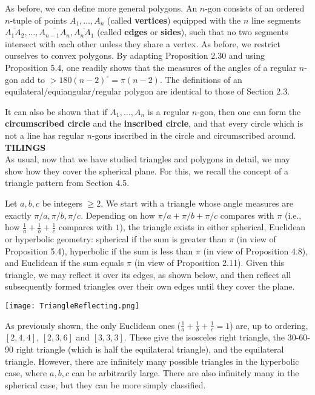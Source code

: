 \documentclass[leqno]{book}
\begin{document}
\noindent As before, we can define more general polygons.  An $n$-gon consists of an ordered $n$-tuple of points $A_1,\dots,A_n$ (called \textbf{vertices}) equipped with the $n$ line segments $\overline{A_1A_2},\dots,\overline{A_{n-1}A_n},\overline{A_nA_1}$ (called \textbf{edges} or \textbf{sides}), such that no two segments intersect with each other unless they share a vertex.  As before, we restrict ourselves to convex polygons.  By adapting Proposition 2.30 and using Proposition 5.4, one readily shows that the measures of the angles of a regular $n$-gon add to $>180(n-2)^\circ=\pi(n-2)$.  The definitions of an equilateral/equiangular/regular polygon are identical to those of Section 2.3.

It can also be shown that if $A_1,\dots,A_n$ is a regular $n$-gon, then one can form the \textbf{circumscribed circle} and the \textbf{inscribed circle}, and that every circle which is not a line has regular $n$-gons inscribed in the circle and circumscribed around.\\

\noindent\textbf{TILINGS}\\

\noindent As usual, now that we have studied triangles and polygons in detail, we may show how they cover the spherical plane.  For this, we recall the concept of a triangle pattern from Section 4.5.

Let $a,b,c$ be integers $\geqslant 2$.  We start with a triangle whose angle measures are exactly $\pi/a,\pi/b,\pi/c$.  Depending on how $\pi/a+\pi/b+\pi/c$ compares with $\pi$ (i.e., how $\frac 1a+\frac 1b+\frac 1c$ compares with $1$), the triangle exists in either spherical, Euclidean or hyperbolic geometry: spherical if the sum is greater than $\pi$ (in view of Proposition 5.4), hyperbolic if the sum is less than $\pi$ (in view of Proposition 4.8), and Euclidean if the sum equals $\pi$ (in view of Proposition 2.11).  Given this triangle, we may reflect it over its edges, as shown below, and then reflect all subsequently formed triangles over their own edges until they cover the plane.
\begin{center}\texttt{[image: TriangleReflecting.png]}\end{center}
As previously shown, the only Euclidean ones ($\frac 1a+\frac 1b+\frac 1c=1$) are, up to ordering, $[2,4,4]$, $[2,3,6]$ and $[3,3,3]$.  These give the isosceles right triangle, the 30-60-90 right triangle (which is half the equilateral triangle), and the equilateral triangle.  However, there are infinitely many possible triangles in the hyperbolic case, where $a,b,c$ can be arbitrarily large.  There are also infinitely many in the spherical case, but they can be more simply classified.
\end{document}
